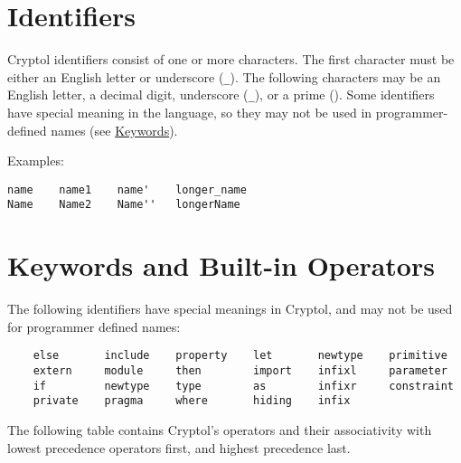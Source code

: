 \section{Identifiers}\label{identifiers}

Cryptol identifiers consist of one or more characters. The first
character must be either an English letter or underscore (\texttt{\_}).
The following characters may be an English letter, a decimal digit,
underscore (\texttt{\_}), or a prime (\texttt{\textquotesingle{}}). Some
identifiers have special meaning in the language, so they may not be
used in programmer-defined names (see
\protect\hyperlink{keywords-and-built-in-operators}{Keywords}).

Examples:

\begin{verbatim}
name    name1    name'    longer_name
Name    Name2    Name''   longerName
\end{verbatim}

\hypertarget{keywords-and-built-in-operators}{\section{Keywords and
Built-in Operators}\label{keywords-and-built-in-operators}}

The following identifiers have special meanings in Cryptol, and may not
be used for programmer defined names:

\begin{verbatim}
    else       include    property    let       newtype    primitive
    extern     module     then        import    infixl     parameter
    if         newtype    type        as        infixr     constraint
    private    pragma     where       hiding    infix
\end{verbatim}

The following table contains Cryptol's operators and their associativity
with lowest precedence operators first, and highest precedence last.

